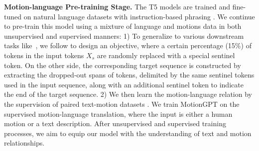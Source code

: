 \textbf{Motion-language Pre-training Stage.} The T5 models \cite{raffel2020t5,chung2022flant5} are trained and fine-tuned on natural language datasets with instruction-based phrasing \cite{chung2022flant5,ouyang2022instructgpt}. We continue to pre-train this model using a mixture of language and motions data in both unsupervised and supervised manners:
1) To generalize to various downstream tasks like~\cite{devlin2018bert,radford2019gpt2,raffel2020t5,ouyang2022instructgpt}, we follow \cite{raffel2020t5} to design an objective, where a certain percentage (15\%) of tokens in the input tokens $X_s$ are randomly replaced with a special sentinel token.
%
%
On the other side, the corresponding target sequence is constructed by extracting the dropped-out spans of tokens, delimited by the same sentinel tokens used in the input sequence, along with an additional sentinel token to indicate the end of the target sequence.
2) We then learn the motion-language relation by the supervision of paired text-motion datasets \cite{Guo_2022_CVPR_humanml3d,Plappert2016kit}. We train MotionGPT on the supervised motion-language translation, where the input is either a human motion or a text description.%
After unsupervised and supervised training processes, we aim to equip our model with the understanding of text and motion relationships.

